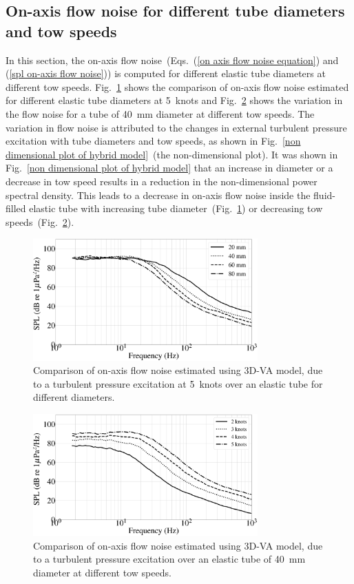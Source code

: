 \documentclass[11pt,cleanfoot]{asme2ej}
\begin{document}

\subsection{On-axis flow noise for different tube diameters and tow speeds}
\label{parametric study}

In this section, the on-axis flow noise~(Eqs.~(\ref{on axis flow noise equation}) and (\ref{spl on-axis flow noise})) is computed for different elastic tube diameters at different tow speeds. Fig.~\ref{flow noise diff dia 3d} shows the comparison of on-axis flow noise estimated for different elastic tube diameters at 5~knots and  Fig.~\ref{flow noise diff speed 3d} shows the variation in the flow noise for a tube of 40~mm diameter at different tow speeds. The variation in flow noise is attributed to the changes in external turbulent pressure excitation with tube diameters and tow speeds, as shown in Fig.~\ref{non dimensional plot of hybrid model}~(the non-dimensional plot). It was shown in Fig.~\ref{non dimensional plot of hybrid model} that an increase in diameter or a decrease in tow speed results in a reduction in the non-dimensional power spectral density. This leads to a decrease in on-axis flow noise inside the fluid-filled elastic tube with increasing tube diameter~(Fig.~\ref{flow noise diff dia 3d}) or decreasing tow speeds~(Fig.~\ref{flow noise diff speed 3d}).

\begin{figure}[ht]
    \centering
    \includegraphics[width=3.4in]{Comparison_of_flow_noise_3D_different_dia.eps}
    \caption{Comparison of on-axis flow noise estimated using 3D-VA model, due to a turbulent pressure excitation at 5~knots over an elastic tube for different diameters.}
    \label{flow noise diff dia 3d}
\end{figure}
\begin{figure}[ht]
    \centering
    \includegraphics[width=3.4in]{Comparison_of_flow_noise_3D_Different_speed.eps}
    \caption{Comparison of on-axis flow noise estimated using 3D-VA model, due to a turbulent pressure excitation over an elastic tube of 40~mm diameter at different tow speeds.}
    \label{flow noise diff speed 3d}
\end{figure}
\end{document}
